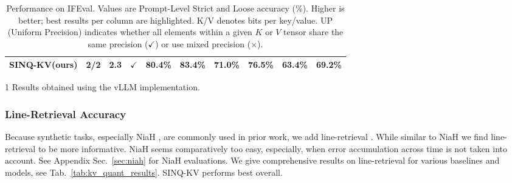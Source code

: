 \documentclass{llmxive}
\providecommand{\ours}[1]{\cellcolor{customblue!30}#1}
\providecommand{\methodname}{SINQ-KV\xspace}
\begin{document}
\begin{table}[t]
\begin{threeparttable}
\begin{tabular}{l c c c cc cc cc}
\textbf{\ours{\methodname (ours)}} & \ours{2/2} & \ours{2.3} & \ours{$\checkmark$}
& \ours{\textbf{80.4\%}} & \ours{\textbf{83.4\%}} 
& \ours{\textbf{71.0\%}} & \ours{\textbf{76.5\%}} 
& \ours{\textbf{63.4\%}} & \ours{\textbf{69.2\%}} \\

\bottomrule
\bottomrule
\end{tabular}
\begin{tablenotes}
\item[1]Results obtained using the vLLM implementation.
\end{tablenotes}
\end{threeparttable}
\caption{Performance on IFEval. Values are Prompt-Level Strict and Loose accuracy (\%). Higher is better; best results per column are highlighted. K/V denotes bits per key/value. UP (Uniform Precision) indicates whether all elements within a given $K$ or $V$ tensor share the same precision ($\checkmark$) or use mixed precision ($\times$).}
\label{tab:ifeval_results_horizontal}
\end{table}






\subsubsection{Line-Retrieval Accuracy}
Because synthetic tasks, especially NiaH \cite{kamradt2023needle}, are commonly used in prior work, we add line-retrieval \cite{li2023how_line-retrieval}.
While similar to NiaH we find line-retrieval to be more informative. NiaH seems comparatively too easy, especially, when error accumulation across time is not taken into account.  See Appendix Sec.~\ref{sec:niah} for NiaH evaluations. We give comprehensive results on line-retrieval for various baselines and models, see Tab.~\ref{tab:kv_quant_results}. \methodname performs best overall. 
\end{document}
